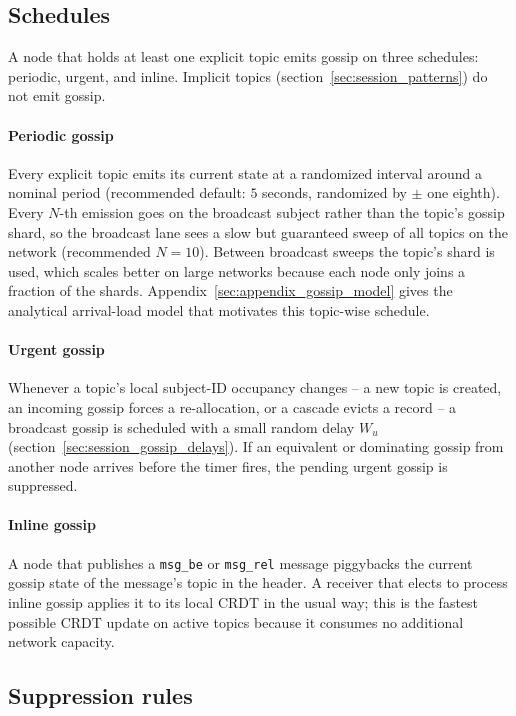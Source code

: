 \subsection{Schedules}

A node that holds at least one explicit topic emits gossip on three schedules:
periodic, urgent, and inline. Implicit topics
(section~\ref{sec:session_patterns}) do not emit gossip.

\paragraph{Periodic gossip} Every explicit topic emits its current state at a
randomized interval around a nominal period (recommended default: $5$ seconds,
randomized by $\pm$ one eighth).
Every $N$-th emission goes on the broadcast subject rather than the topic's
gossip shard, so the broadcast lane sees a slow but guaranteed sweep of all
topics on the network (recommended $N = 10$).
Between broadcast sweeps the topic's shard is used, which scales better on large
networks because each node only joins a fraction of the shards.
Appendix~\ref{sec:appendix_gossip_model} gives the analytical arrival-load
model that motivates this topic-wise schedule.

\paragraph{Urgent gossip} Whenever a topic's local subject-ID occupancy changes
-- a new topic is created, an incoming gossip forces a re-allocation, or a
cascade evicts a record -- a broadcast gossip is scheduled with a small random
delay $W_u$ (section~\ref{sec:session_gossip_delays}). If an equivalent or
dominating gossip from another node arrives before the timer fires, the pending
urgent gossip is suppressed.

\paragraph{Inline gossip} A node that publishes a \texttt{msg\_be} or
\texttt{msg\_rel} message piggybacks the current gossip state of the message's
topic in the header. A receiver that elects to process inline gossip applies it
to its local CRDT in the usual way; this is the fastest possible CRDT update on
active topics because it consumes no additional network capacity.

\subsection{Suppression rules}\label{sec:session_gossip_suppression}

